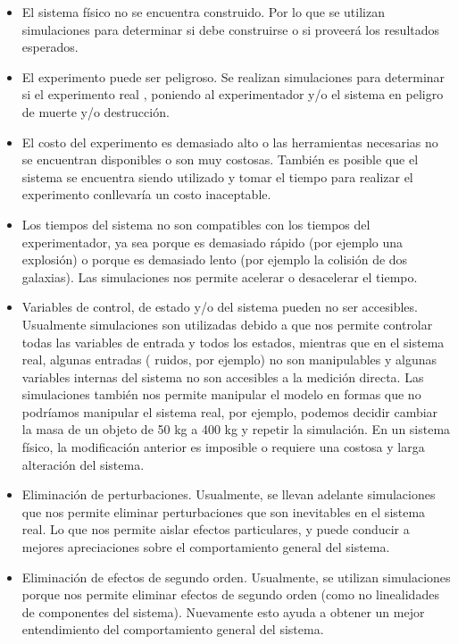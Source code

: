 \begin{itemize}
	\item El sistema físico no se encuentra construido. Por lo que se utilizan simulaciones para determinar si debe construirse o si proveerá los resultados esperados.
	
	\item El experimento puede ser peligroso. Se realizan simulaciones para determinar si el experimento real , poniendo al experimentador y/o el sistema en peligro de muerte y/o destrucción.

	\item El costo del experimento es demasiado alto o las herramientas necesarias no se encuentran disponibles o son muy costosas.
 También es posible que el sistema se encuentra siendo utilizado y tomar el tiempo para realizar el experimento conllevaría un costo inaceptable.

	\item Los tiempos del sistema no son compatibles con los tiempos del experimentador, ya sea porque es demasiado rápido (por ejemplo una explosión) o porque es demasiado lento (por ejemplo la colisión de dos galaxias). Las simulaciones nos permite acelerar o desacelerar el tiempo.

	\item Variables de control, de estado y/o del sistema pueden no ser accesibles. Usualmente simulaciones son utilizadas debido a que nos permite controlar todas las variables de entrada y todos los estados, mientras que en el sistema real, algunas entradas ( ruidos, por ejemplo) no son manipulables y algunas variables internas del sistema no son accesibles a la medición directa. Las simulaciones también nos permite manipular el modelo en formas que no podríamos manipular el sistema real, por ejemplo, podemos decidir cambiar la masa de un objeto de 50 kg a 400 kg y repetir la simulación. En un sistema físico, la modificación anterior es imposible o requiere una costosa y larga alteración del sistema.

	\item Eliminación de perturbaciones. Usualmente, se llevan adelante simulaciones que nos permite eliminar perturbaciones que son inevitables en el sistema real. Lo que nos permite aislar efectos particulares, y puede conducir a mejores apreciaciones sobre el comportamiento general del sistema.

	\item Eliminación de efectos de segundo orden. Usualmente, se utilizan simulaciones porque nos permite eliminar efectos de segundo orden (como no linealidades de componentes del sistema). Nuevamente esto ayuda a obtener un mejor entendimiento del comportamiento general del sistema.
\end{itemize}

